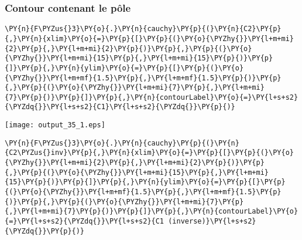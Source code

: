 \subsubsection{Contour contenant le pôle}
\begin{tcolorbox}[breakable, size=fbox, boxrule=1pt, pad at break*=1mm,colback=cellbackground, colframe=cellborder]
\begin{Verbatim}[commandchars=\\\{\}]
\PY{n}{F\PYZus{}3}\PY{o}{.}\PY{n}{cauchy}\PY{p}{(}\PY{n}{C2}\PY{p}{,}\PY{n}{xlim}\PY{o}{=}\PY{p}{[}\PY{p}{(}\PY{o}{\PYZhy{}}\PY{l+m+mi}{2}\PY{p}{,}\PY{l+m+mi}{2}\PY{p}{)}\PY{p}{,}\PY{p}{(}\PY{o}{\PYZhy{}}\PY{l+m+mi}{15}\PY{p}{,}\PY{l+m+mi}{15}\PY{p}{)}\PY{p}{]}\PY{p}{,}\PY{n}{ylim}\PY{o}{=}\PY{p}{[}\PY{p}{(}\PY{o}{\PYZhy{}}\PY{l+m+mf}{1.5}\PY{p}{,}\PY{l+m+mf}{1.5}\PY{p}{)}\PY{p}{,}\PY{p}{(}\PY{o}{\PYZhy{}}\PY{l+m+mi}{7}\PY{p}{,}\PY{l+m+mi}{7}\PY{p}{)}\PY{p}{]}\PY{p}{,}\PY{n}{contourLabel}\PY{o}{=}\PY{l+s+s2}{\PYZdq{}}\PY{l+s+s2}{C1}\PY{l+s+s2}{\PYZdq{}}\PY{p}{)}
\end{Verbatim}
\end{tcolorbox}
\begin{center}
    \texttt{[image: output\_35\_1.eps]}
\end{center}
\begin{tcolorbox}[breakable, size=fbox, boxrule=1pt, pad at break*=1mm,colback=cellbackground, colframe=cellborder]
\begin{Verbatim}[commandchars=\\\{\}]
\PY{n}{F\PYZus{}3}\PY{o}{.}\PY{n}{cauchy}\PY{p}{(}\PY{n}{C2\PYZus{}inv}\PY{p}{,}\PY{n}{xlim}\PY{o}{=}\PY{p}{[}\PY{p}{(}\PY{o}{\PYZhy{}}\PY{l+m+mi}{2}\PY{p}{,}\PY{l+m+mi}{2}\PY{p}{)}\PY{p}{,}\PY{p}{(}\PY{o}{\PYZhy{}}\PY{l+m+mi}{15}\PY{p}{,}\PY{l+m+mi}{15}\PY{p}{)}\PY{p}{]}\PY{p}{,}\PY{n}{ylim}\PY{o}{=}\PY{p}{[}\PY{p}{(}\PY{o}{\PYZhy{}}\PY{l+m+mf}{1.5}\PY{p}{,}\PY{l+m+mf}{1.5}\PY{p}{)}\PY{p}{,}\PY{p}{(}\PY{o}{\PYZhy{}}\PY{l+m+mi}{7}\PY{p}{,}\PY{l+m+mi}{7}\PY{p}{)}\PY{p}{]}\PY{p}{,}\PY{n}{contourLabel}\PY{o}{=}\PY{l+s+s2}{\PYZdq{}}\PY{l+s+s2}{C1 (inverse)}\PY{l+s+s2}{\PYZdq{}}\PY{p}{)}
\end{Verbatim}
\end{tcolorbox}
